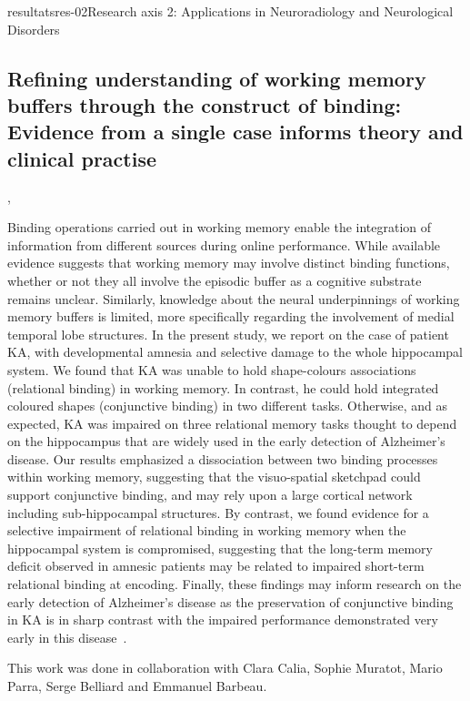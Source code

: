 \documentclass{ra2018}
\begin{document}
\begin{module}{resultats}{res-02}{Research axis 2: Applications in Neuroradiology and Neurological Disorders}
\subsection{Refining understanding of working memory buffers through the construct of binding: Evidence from a single case informs theory and clinical practise}
\begin{participants}
      ,
\end{participants}
Binding operations carried out in working memory enable the integration of information from different sources during online performance. While available evidence suggests that working memory may involve distinct binding functions, whether or not they all involve the episodic buffer as a cognitive substrate remains unclear. Similarly, knowledge about the neural underpinnings of working memory buffers is limited, more specifically regarding the involvement of medial temporal lobe structures. In the present study, we report on the case of patient KA, with developmental amnesia and selective damage to the whole hippocampal system. We found that KA was unable to hold shape-colours associations (relational binding) in working memory. In contrast, he could hold integrated coloured shapes (conjunctive binding) in two different tasks. Otherwise, and as expected, KA was impaired on three relational memory tasks thought to depend on the hippocampus that are widely used in the early detection of Alzheimer's disease. Our results emphasized a dissociation between two binding processes within working memory, suggesting that the visuo-spatial sketchpad could support conjunctive binding, and may rely upon a large cortical network including sub-hippocampal structures. By contrast, we found evidence for a selective impairment of relational binding in working memory when the hippocampal system is compromised, suggesting that the long-term memory deficit observed in amnesic patients may be related to impaired short-term relational binding at encoding. Finally, these findings may inform research on the early detection of Alzheimer's disease as the preservation of conjunctive binding in KA is in sharp contrast with the impaired performance demonstrated very early in this disease~\cite{jonin:inserm-01916090}.

This work was done in collaboration with Clara Calia, Sophie Muratot, Mario Parra, Serge Belliard and Emmanuel Barbeau.


\end{module}
\end{document}
